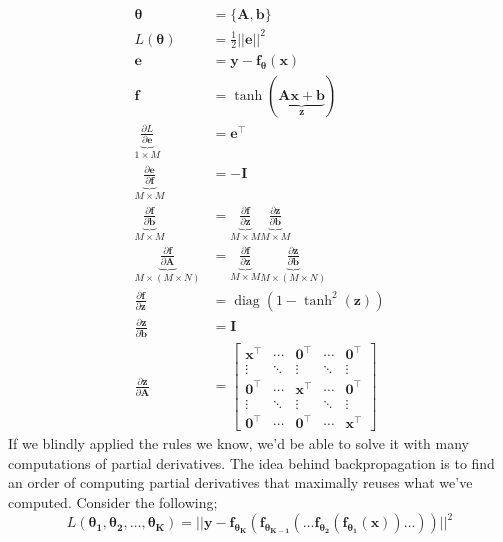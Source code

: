 \documentclass[a4paper, 12pt]{article}
\newcommand{\pdif}[2]{\frac{\partial #1}{\partial #2}}
\newcommand{\mat}[1]{\boldsymbol{#1}}
\renewcommand{\vec}[1]{\boldsymbol{#1}}
\DeclareMathOperator*{\diag}{diag}
\begin{document}
                \begin{align*}
                    \vec{\theta} & = \{\mat{A}, \vec{b}\} \\
                    L(\vec{\theta}) & = \frac{1}{2} || \vec{e} ||^2 \\
                    \vec{e} & = \vec{y} - \vec{f}_{\vec{\theta}}(\vec{x}) \\
                    \vec{f} & = \tanh(\underbrace{\mat{A}\vec{x} + \vec{b}}_{\vec{z}}) \\
                    \underbrace{\pdif{L}{\vec{e}}}_{1 \times M} & = \vec{e}^\top \\
                    \underbrace{\pdif{\vec{e}}{\vec{f}}}_{M \times M} & = -\mat{I} \\
                    \underbrace{\pdif{\vec{f}}{\vec{b}}}_{M \times M} & = \underbrace{\pdif{\vec{f}}{\vec{z}}}_{M \times M} \underbrace{\pdif{\vec{z}}{\vec{b}}}_{M \times M} \\
                    \underbrace{\pdif{\vec{f}}{\mat{A}}}_{M \times (M \times N)} & = \underbrace{\pdif{\vec{f}}{\vec{z}}}_{M \times M} \underbrace{\pdif{\vec{z}}{\mat{b}}}_{M \times (M \times N)} \\
                    \pdif{\vec{f}}{\vec{z}} & = \diag(1 - \tanh^2(\vec{z})) \\
                    \pdif{\vec{z}}{\vec{b}} & = \mat{I} \\
                    \pdif{\vec{z}}{\mat{A}} & = \begin{bmatrix}
                        \vec{x}^\top & \cdots & \vec{0}^\top & \cdots & \vec{0}^\top \\
                        \vdots & \ddots & \vdots & \ddots & \vdots \\
                        \vec{0}^\top & \cdots & \vec{x}^\top & \cdots & \vec{0}^\top \\
                        \vdots & \ddots & \vdots & \ddots & \vdots \\
                        \vec{0}^\top & \cdots & \vec{0}^\top & \cdots & \vec{x}^\top
                    \end{bmatrix}
                \end{align*}
                If we blindly applied the rules we know, we'd be able to solve it with many computations of partial derivatives.
                The idea behind backpropagation is to find an order of computing partial derivatives that maximally reuses what we've computed.
                Consider the following;
                $$L(\vec{\theta_1}, \vec{\theta_2}, \dots, \vec{\theta_K}) = || \vec{y} - \vec{f_{\vec{\theta_K}}}(\vec{f_{\vec{\theta_{K - 1}}}}(\dots \vec{f_{\vec{\theta_2}}}(\vec{f_{\vec{\theta_1}}}(\vec{x})) \dots))||^2$$
\end{document}
